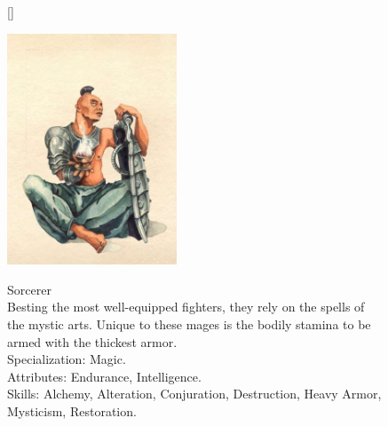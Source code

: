 \documentclass[12pt]{book}
\begin{document}
\begin{figure}[H]
[\FBwidth]
{\caption*{Sorcerer\\

Besting the most well-equipped fighters, they rely on the spells of the mystic arts. Unique to these mages is the bodily stamina to be armed with the thickest armor.\\

Specialization: Magic.\\

Attributes: Endurance, Intelligence.\\

Skills: Alchemy, Alteration, Conjuration, Destruction, Heavy Armor, Mysticism, Restoration.}\label{fig:test}}
{\includegraphics[width=0.45\textwidth]{Sorcerer.png}}
\end{figure}
\end{document}
